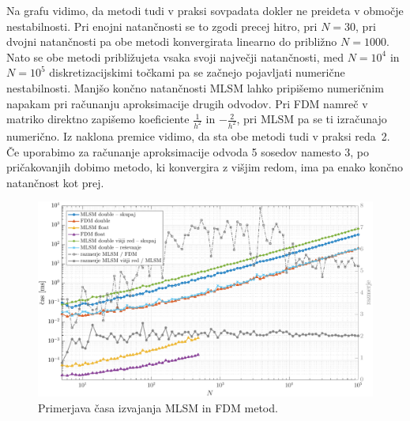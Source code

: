 \documentclass[a4paper,twoside]{article}
\theoremstyle{definition} %
\theoremstyle{plain} %
\numberwithin{equation}{section}
\newlength{\iw}
\begin{document}
Na grafu vidimo, da metodi tudi v praksi sovpadata dokler ne preideta v območje
nestabilnosti. Pri enojni natančnosti se to zgodi precej hitro, pri $N = 30$,
pri dvojni natančnosti pa obe metodi konvergirata linearno do približno $N = 1000$.
Nato se obe metodi približujeta vsaka svoji največji natančnosti,
med $N = 10^4$ in $N = 10^5$ diskretizacijskimi točkami pa se začnejo pojavljati
numerične nestabilnosti. Manjšo končno natančnosti MLSM lahko pripišemo
numeričnim napakam pri računanju aproksimacije drugih odvodov. Pri FDM namreč v
matriko direktno zapišemo koeficiente $\frac{1}{h^2}$ in $-\frac{2}{h^2}$, pri
MLSM pa se ti izračunajo numerično. Iz naklona premice vidimo, da sta obe metodi
tudi v praksi reda~2. Če uporabimo za računanje aproksimacije odvoda 5 sosedov
namesto 3, po pričakovanjih dobimo metodo, ki konvergira z višjim redom, ima pa
enako končno natančnost kot prej.

\begin{figure}[h]
  \centering
  \includegraphics[width=\iw]{images/lap1d_times.pdf}
  \caption{Primerjava časa izvajanja MLSM in FDM metod.}
  \label{fig:mlsm-fdm-time}
\end{figure}
\end{document}
